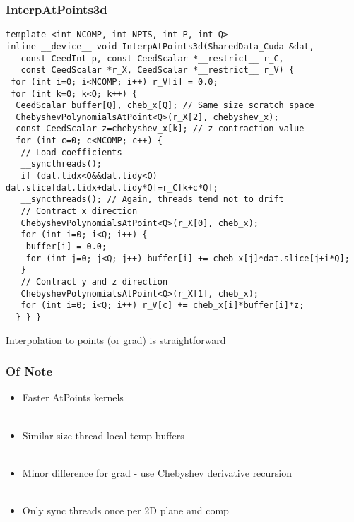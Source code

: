 \documentclass{beamer}
\begin{document}

\begin{frame}[fragile]
\begin{center}
\frametitle{InterpAtPoints3d}

{\tiny
\begin{lstlisting}[style=boxedC]
template <int NCOMP, int NPTS, int P, int Q>
inline __device__ void InterpAtPoints3d(SharedData_Cuda &dat,
   const CeedInt p, const CeedScalar *__restrict__ r_C,
   const CeedScalar *r_X, CeedScalar *__restrict__ r_V) {
 for (int i=0; i<NCOMP; i++) r_V[i] = 0.0;
 for (int k=0; k<Q; k++) {
  CeedScalar buffer[Q], cheb_x[Q]; // Same size scratch space
  ChebyshevPolynomialsAtPoint<Q>(r_X[2], chebyshev_x);
  const CeedScalar z=chebyshev_x[k]; // z contraction value
  for (int c=0; c<NCOMP; c++) {
   // Load coefficients
   __syncthreads();
   if (dat.tidx<Q&&dat.tidy<Q) dat.slice[dat.tidx+dat.tidy*Q]=r_C[k+c*Q];
   __syncthreads(); // Again, threads tend not to drift
   // Contract x direction
   ChebyshevPolynomialsAtPoint<Q>(r_X[0], cheb_x);
   for (int i=0; i<Q; i++) {
    buffer[i] = 0.0;
    for (int j=0; j<Q; j++) buffer[i] += cheb_x[j]*dat.slice[j+i*Q];
   }
   // Contract y and z direction
   ChebyshevPolynomialsAtPoint<Q>(r_X[1], cheb_x);
   for (int i=0; i<Q; i++) r_V[c] += cheb_x[i]*buffer[i]*z;
  } } }
\end{lstlisting}
}

Interpolation to points (or grad) is straightforward\\

\end{center}
\end{frame}


\begin{frame}
\begin{center}
\frametitle{Of Note}

\begin{itemize}

\item Faster AtPoints kernels\\

~\\

\item Similar size thread local temp buffers\\

~\\

\item Minor difference for grad - use Chebyshev derivative recursion\\

~\\

\item Only sync threads once per 2D plane and comp\\

\end{itemize}

\end{center}
\end{frame}
\end{document}
